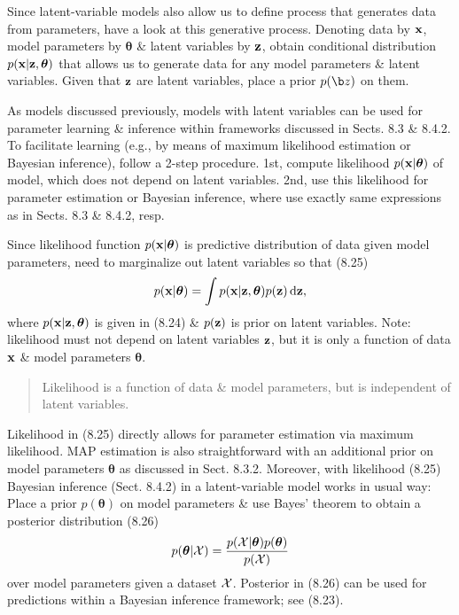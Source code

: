 \documentclass{article}
\begin{document}
\begin{itemize}
\begin{itemize}
\begin{itemize}
			Since latent-variable models also allow us to define process that generates data from parameters, have a look at this generative process. Denoting data by ${\bf x}$, model parameters by $\boldsymbol{\theta}$ \& latent variables by ${\bf z}$, obtain conditional distribution $p({\bf x}|{\bf z},\boldsymbol{\theta})$ that allows us to generate data for any model parameters \& latent variables. Given that ${\bf z}$ are latent variables, place a prior $p({\b z})$ on them.
			
			As models discussed previously, models with latent variables can be used for parameter learning \& inference within frameworks discussed in Sects. 8.3 \& 8.4.2. To facilitate learning (e.g., by means of maximum likelihood estimation or Bayesian inference), follow a 2-step procedure. 1st, compute likelihood $p({\bf x}|\boldsymbol{\theta})$ of model, which does not depend on latent variables. 2nd, use this likelihood for parameter estimation or Bayesian inference, where use exactly same expressions as in Sects. 8.3 \& 8.4.2, resp.
			
			Since likelihood function $p({\bf x}|\boldsymbol{\theta})$ is predictive distribution of data given model parameters, need to marginalize out latent variables so that (8.25)
			\begin{equation}
				p({\bf x}|\boldsymbol{\theta}) = \int p({\bf x}|{\bf z},\boldsymbol{\theta})p({\bf z})\,{\rm d}{\bf z},
			\end{equation}
			where $p({\bf x}|{\bf z},\boldsymbol{\theta})$ is given in (8.24) \& $p({\bf z})$ is prior on latent variables. Note: likelihood must not depend on latent variables ${\bf z}$, but it is only a function of data ${\bf x}$ \& model parameters $\boldsymbol{\theta}$.
			\begin{quote}
				Likelihood is a function of data \& model parameters, but is independent of latent variables.
			\end{quote}
			Likelihood in (8.25) directly allows for parameter estimation via maximum likelihood. MAP estimation is also straightforward with an additional prior on model parameters $\boldsymbol{\theta}$ as discussed in Sect. 8.3.2. Moreover, with likelihood (8.25) Bayesian inference (Sect. 8.4.2) in a latent-variable model works in usual way: Place a prior $p(\boldsymbol{\theta})$ on model parameters \& use Bayes' theorem to obtain a posterior distribution (8.26)
			\begin{equation}
				p(\boldsymbol{\theta}|{\cal X}) = \frac{p({\cal X}|\boldsymbol{\theta})p(\boldsymbol{\theta})}{p({\cal X})}
			\end{equation}
			over model parameters given  a dataset ${\cal X}$. Posterior in (8.26) can be used for predictions within a Bayesian inference framework; see (8.23).
			

\end{itemize}
\end{itemize}
\end{itemize}
\end{document}
